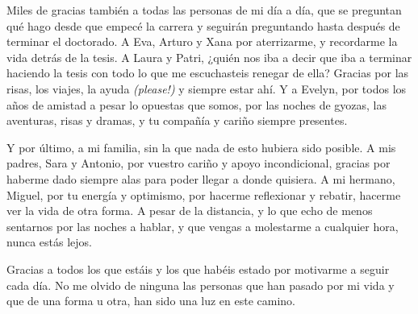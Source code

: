 Miles de gracias también a todas las personas de mi día a día, que se preguntan qué hago desde que empecé la carrera y seguirán preguntando hasta después de terminar el doctorado. 
A Eva, Arturo y Xana por aterrizarme, y recordarme la vida detrás de la tesis. 
A Laura y Patri, ¿quién nos iba a decir que iba a terminar haciendo la tesis con todo lo que me escuchasteis renegar de ella? Gracias por las risas, los viajes, la ayuda \textit{(please!)} y siempre estar ahí. 
Y a Evelyn, por todos los años de amistad a pesar lo opuestas que somos, por las noches de gyozas, las aventuras, risas y dramas, y tu compañía y cariño siempre presentes. 

Y por último, a mi familia, sin la que nada de esto hubiera sido posible.
A mis padres, Sara y Antonio, por vuestro cariño y apoyo incondicional, gracias por haberme dado siempre alas para poder llegar a donde quisiera. 
A mi hermano, Miguel, por tu energía y optimismo, por hacerme reflexionar y rebatir, hacerme ver la vida de otra forma. 
A pesar de la distancia, y lo que echo de menos sentarnos por las noches a hablar, y que vengas a molestarme a cualquier hora, nunca estás lejos. 

Gracias a todos los que estáis y los que habéis estado por motivarme a seguir cada día. 
No me olvido de ninguna las personas que han pasado por mi vida y que de una forma u otra, han sido una luz en este camino. 




